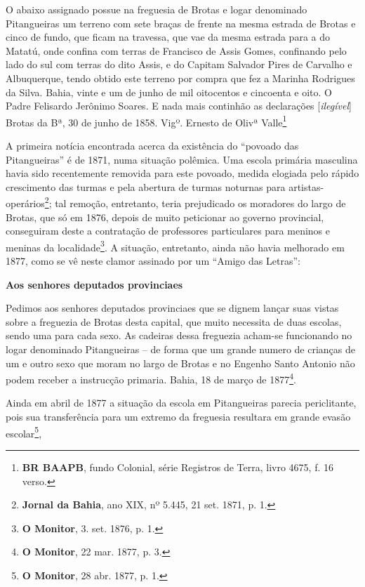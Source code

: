 \begin{citacao}
O abaixo assignado possue na freguesia de Brotas e logar denominado Pitangueiras um terreno com sete braças de frente na mesma estrada de Brotas e cinco de fundo, que ficam na travessa, que vae da mesma estrada para a do Matatú, onde confina com terras de Francisco de Assis Gomes, confinando pelo lado do sul com terras do dito Assis, e do Capitam Salvador Pires de Carvalho e Albuquerque, tendo obtido este terreno por compra que fez a Marinha Rodrigues da Silva. Bahia, vinte e um de junho de mil oitocentos e cincoenta e oito. O Padre Felisardo Jerônimo Soares. E nada mais continhão as declarações [\textit{ilegível}] Brotas da Bª, 30 de junho de 1858. 
Vigº. Ernesto de Olivª Valle\footnote{\textbf{BR BAAPB}, fundo Colonial, série Registros de Terra, livro 4675, f. 16 verso.}
\end{citacao}

A primeira notícia encontrada acerca da existência do ``povoado das Pitangueiras'' é de 1871, numa situação polêmica. Uma escola primária masculina havia sido recentemente removida para este povoado, medida elogiada pelo rápido crescimento das turmas e pela abertura de turmas noturnas para artistas-operários\footnote{\textbf{Jornal da Bahia}, ano XIX, nº 5.445, 21 set. 1871, p. 1.}; tal remoção, entretanto, teria prejudicado os moradores do largo de Brotas, que só em 1876, depois de muito peticionar ao governo provincial, conseguiram deste a contratação de professores particulares para meninos e meninas da localidade\footnote{\textbf{O Monitor}, 3. set. 1876, p. 1.}. A situação, entretanto, ainda não havia melhorado em 1877, como se vê neste clamor assinado por um ``Amigo das Letras'':

\begin{citacao}
\textbf{Aos senhores deputados provinciaes}

Pedimos aos senhores deputados provinciaes que se dignem lançar suas vistas sobre a freguezia de Brotas desta capital, que muito necessita de duas escolas, sendo uma para cada sexo. As cadeiras dessa freguezia acham-se funcionando no logar denominado Pitangueiras -- de forma que um grande numero de crianças de um e outro sexo que moram no largo de Brotas e no Engenho Santo Antonio não podem receber a instrucção primaria.
Bahia, 18 de março de 1877\footnote{\textbf{O Monitor}, 22 mar. 1877, p. 3.}.
\end{citacao}

Ainda em abril de 1877 a situação da escola em Pitangueiras parecia periclitante, pois sua transferência para um extremo da freguesia resultara em grande evasão escolar\footnote{\textbf{O Monitor}, 28 abr. 1877, p. 1.},

